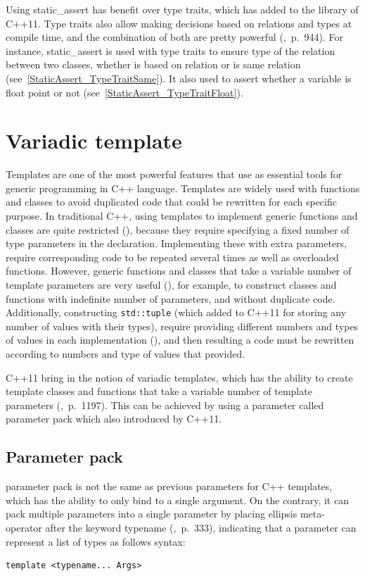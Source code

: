 \documentclass[11pt]{report}
\begin{document}
Using static\_assert has benefit over type traits, which has added to the library of C++11. Type traits also allow making decisions based on relations and types at compile time, and the combination of both are pretty powerful (\cite{Gregorie:professionalcpp},~p.~944). For instance, static\_assert is used with type traits to ensure type of the relation between two classes, whether is based on relation or is same relation (see~\ref{StaticAssert_TypeTraitSame}). It also used to assert whether a variable is float point or not (see~\ref{StaticAssert_TypeTraitFloat}).

\section{Variadic template}
\label{section: Variadic template}
Templates are one of the most powerful features that use as essential tools for generic programming in C++ language. Templates are widely used with functions and classes to avoid duplicated code that could be rewritten for each specific purpose. In traditional C++, using templates to implement generic functions and classes are quite restricted (\cite{Stroustrup:2012:Cpp11}), because they require specifying a fixed number of type parameters in the declaration. Implementing these with extra parameters, require corresponding code to be repeated several times as well as overloaded functions. However, generic functions and classes that take a variable number of template parameters are very useful (\cite{Gregor:2007:VTC}), for example, to construct classes and functions with indefinite number of parameters, and without duplicate code. Additionally, constructing \texttt{std::tuple} (which added to C++11 for storing any number of values with their types), require providing different numbers and types of values in each implementation (\cite{Gregor:2007:VTC}), and then resulting a code must be rewritten according to numbers and type of values that provided.

C++11 bring in the notion of variadic templates, which has the ability to create template classes and functions that take a variable number of template parameters (\cite{Prata:2012:Cpp},~p.~1197). This can be achieved by using a parameter called parameter pack which also introduced by C++11.

\subsection{Parameter pack}
\label{subsection: Parameter pack}
parameter pack is not the same as previous parameters for C++ templates, which has the ability to only bind to a single argument. On the contrary, it can pack multiple parameters into a single parameter by placing ellipsis meta-operator after the keyword typename (\cite{Prata:2012:Cpp},~p.~333), indicating that a parameter can represent a list of types as follows syntax:
\begin{lstlisting}
template <typename... Args>
\end{lstlisting}
\end{document}
